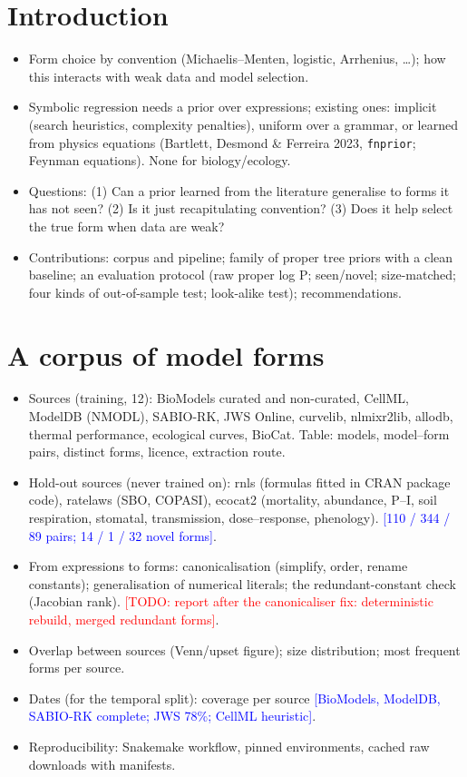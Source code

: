 \documentclass[11pt]{article}
\newcommand{\cur}[1]{\textcolor{blue}{[#1]}}
\newcommand{\todo}[1]{\textcolor{red}{[TODO: #1]}}
\begin{document}
\section{Introduction}
\begin{itemize}
  \item Form choice by convention (Michaelis--Menten, logistic, Arrhenius, \dots); how this interacts
  with weak data and model selection.
  \item Symbolic regression needs a prior over expressions; existing ones: implicit (search
  heuristics, complexity penalties), uniform over a grammar, or learned from physics equations
  (Bartlett, Desmond \& Ferreira 2023, \texttt{fnprior}; Feynman equations). None for biology/ecology.
  \item Questions: (1) Can a prior learned from the literature generalise to forms it has not seen?
  (2) Is it just recapitulating convention? (3) Does it help select the true form when data are weak?
  \item Contributions: corpus and pipeline; family of proper tree priors with a clean baseline; an
  evaluation protocol (raw proper log P; seen/novel; size-matched; four kinds of out-of-sample test;
  look-alike test); recommendations.
\end{itemize}

\section{A corpus of model forms}
\begin{itemize}
  \item Sources (training, 12): BioModels curated and non-curated, CellML, ModelDB (NMODL), SABIO-RK,
  JWS Online, curvelib, nlmixr2lib, allodb, thermal performance, ecological curves, BioCat. Table:
  models, model--form pairs, distinct forms, licence, extraction route.
  \item Hold-out sources (never trained on): rnls (formulas fitted in CRAN package code),
  ratelaws (SBO, COPASI), ecocat2 (mortality, abundance, P--I, soil respiration, stomatal,
  transmission, dose--response, phenology). \cur{110 / 344 / 89 pairs; 14 / 1 / 32 novel forms}.
  \item From expressions to forms: canonicalisation (simplify, order, rename constants);
  generalisation of numerical literals; the redundant-constant check (Jacobian rank).
  \todo{report after the canonicaliser fix: deterministic rebuild, merged redundant forms}.
  \item Overlap between sources (Venn/upset figure); size distribution; most frequent forms per source.
  \item Dates (for the temporal split): coverage per source \cur{BioModels, ModelDB, SABIO-RK complete;
  JWS 78\%; CellML heuristic}.
  \item Reproducibility: Snakemake workflow, pinned environments, cached raw downloads with manifests.
\end{itemize}
\end{document}
